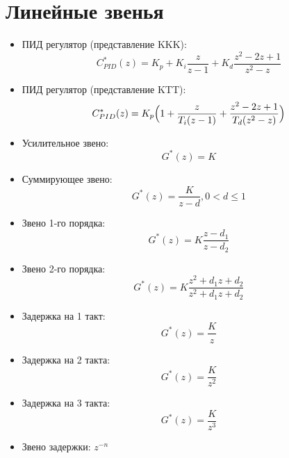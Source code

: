 \documentclass[12pt]{article}
\begin{document}
\section{Линейные звенья}

\begin{itemize}


\item ПИД регулятор (представление KKK):
  $$C_{PID}^*(z)=K_p+K_i\frac{z}{z-1}+K_d\frac{z^2-2z+1}{z^2-z}$$

\item ПИД регулятор (представление KTT):
  $$C_{PID}^*(z)=K_p\Bigl(1+\frac{z}{T_i(z-1)}+\frac{z^2-2z+1}{T_d(z^2-z)}\Bigr)$$

\item Усилительное звено:
$$G^*(z)=K$$

\item Суммирующее звено:
$$G^*(z)=\frac{K}{z-d}, 0<d\le 1$$

\item Звено 1-го порядка:
$$G^*(z)=K\frac{z-d_1}{z-d_2}$$

\item Звено 2-го порядка:
$$G^*(z)=K\frac{z^2+d_1z+d_2}{z^2+d_1z+d_2}$$

\item Задержка на 1 такт:
$$G^*(z)=\frac{K}{z}$$

\item Задержка на 2 такта:
$$G^*(z)=\frac{K}{z^2}$$

\item Задержка на 3 такта:
$$G^*(z)=\frac{K}{z^3}$$

\item Звено задержки: $z^{-n}$


\end{itemize}
\end{document}

